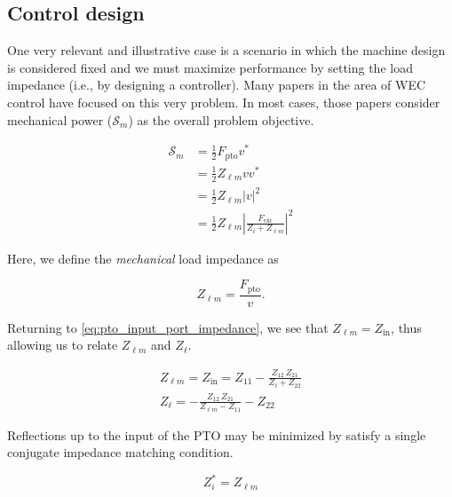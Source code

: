 \documentclass[lettersize,journal]{IEEEtran}
\begin{document}
\subsection{Control design}\label{sec:control_design}
One very relevant and illustrative case is a scenario in which the machine design is considered fixed and we must maximize performance by setting the load impedance (i.e., by designing a controller).
Many papers in the area of WEC control have focused on this very problem.
In most cases, those papers consider mechanical power ($\mathcal{S}_{m}$) as the overall problem objective.

\begin{equation}
\begin{aligned}
        \mathcal{S}_{m} 
        &= \frac{1}{2} F_{\textrm{pto}} v^* \\
        &= \frac{1}{2}Z_{\ell m} v v^* \\
        &= \frac{1}{2}Z_{\ell m} | v |^2 \\
        &= \frac{1}{2} Z_{\ell m} \left| \frac{F_{\textrm{exc}}}{Z_i + Z_{\ell m}} \right|^2
\end{aligned}
\end{equation}

\noindent{}Here, we define the \emph{mechanical} load impedance as

\begin{equation}
        Z_{\ell m} = \frac{F_{\textrm{pto}}}{v} .
\end{equation}

\noindent{}Returning to \eqref{eq:pto_input_port_impedance}, we see that $Z_{\ell m}=Z_{\textrm{in}}$, thus allowing us to relate $Z_{\ell m}$ and $Z_{\ell}$.

\begin{subequations}
        \begin{gather}
                Z_{\ell m} = Z_{\textrm{in}} = Z_{11} - \frac{Z_{12} \, Z_{21}}{Z_\ell + Z_{22}} \\
                Z_\ell = - \frac{Z_{12} \,Z_{21} }{Z_{\ell m} - Z_{11}} - Z_{22}
        \end{gather}
        \label{eq:Zl_Zlm}
\end{subequations}

Reflections up to the input of the PTO may be minimized by satisfy a single conjugate impedance matching condition.

\begin{equation}
        Z_i^* = Z_{\ell m}
        \label{eq:mech_power_impedance_matching}
\end{equation}
\end{document}
